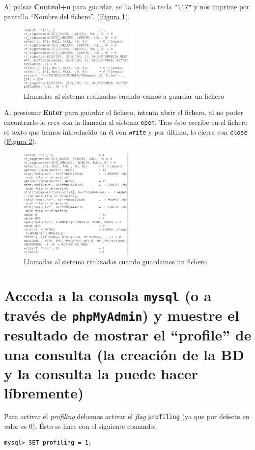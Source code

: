 \documentclass[10pt,a4paper,spanish]{article}
\numberwithin{equation}{section} %
\numberwithin{figure}{section} %
\numberwithin{table}{section} %
\begin{document}
Al pulsar \textbf{Control+o} para guardar, se ha leído la tecla \texttt{"$\setminus$17"} y nos imprime por pantalla ``Nombre del fichero''. (\hyperref[guardar]{Figura \ref*{guardar}}).

\begin{figure}[!h]
    \centering
    \includegraphics[width=0.5\textwidth]{40}
    \caption{Llamadas al sistema realizadas cuando vamos a guardar un fichero}
    \label{guardar}
\end{figure}

Al presionar \textbf{Enter} para guardar el fichero, intenta abrir el fichero, al no poder encontrarlo lo crea con la llamada al sistema \texttt{open}. Tras ésto escribe en el fichero el texto que hemos introducido en él con \texttt{write} y por último, lo cierra con \texttt{close} (\hyperref[fichero]{Figura \ref*{fichero}}).

\begin{figure}[!h]
    \centering
    \includegraphics[width=0.5\textwidth]{41}
    \caption{Llamadas al sistema realizadas cuando guardamos un fichero}
    \label{fichero}
\end{figure}

\section{Acceda a la consola \texttt{mysql} (o a través de \texttt{phpMyAdmin}) y muestre el resultado de mostrar el ``profile'' de una consulta (la creación de la BD y la consulta la puede hacer líbremente)}
Para activar el \textit{profiling} debemos activar el \textit{flag} \texttt{profiling} (ya que por defecto su valor es 0). Ésto se hace con el siguiente comando:
\begin{verbatim}
mysql> SET profiling = 1;
\end{verbatim}
\end{document}
